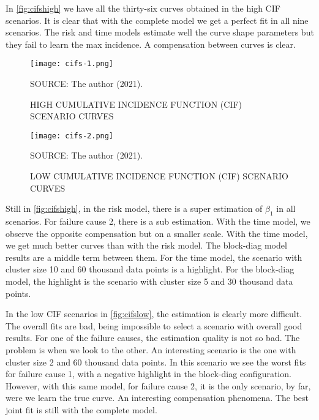 In \autoref{fig:cifshigh} we have all the thirty-six curves obtained in
the high CIF scenarios. It is clear that with the complete model we get
a perfect fit in all nine scenarios. The risk and time models estimate
well the curve shape parameters but they fail to learn the max
incidence. A compensation between curves is clear.

\begin{figure}[H]
 \setlength{\abovecaptionskip}{.0001pt}
 \caption{HIGH CUMULATIVE INCIDENCE FUNCTION (CIF) SCENARIO CURVES}
 \vspace{0.2cm}\centering
 \texttt{[image: cifs-1.png]}\\
 \begin{footnotesize}
  SOURCE: The author (2021).
 \end{footnotesize}
 \label{fig:cifshigh}
\end{figure}

\begin{figure}[H]
 \setlength{\abovecaptionskip}{.0001pt}
 \caption{LOW CUMULATIVE INCIDENCE FUNCTION (CIF) SCENARIO CURVES}
 \vspace{0.2cm}\centering
 \texttt{[image: cifs-2.png]}\\
 \begin{footnotesize}
  SOURCE: The author (2021).
 \end{footnotesize}
 \label{fig:cifslow}
\end{figure}

Still in \autoref{fig:cifshigh}, in the risk model, there is a super
estimation of \(\beta_{1}\) in all scenarios. For failure cause 2, there
is a sub estimation. With the time model, we observe the opposite
compensation but on a smaller scale. With the time model, we get much
better curves than with the risk model. The block-diag model results are
a middle term between them. For the time model, the scenario with
cluster size 10 and 60 thousand data points is a highlight. For the
block-diag model, the highlight is the scenario with cluster size 5 and
30 thousand data points.

In the low CIF scenarios in \autoref{fig:cifslow}, the estimation is
clearly more difficult. The overall fits are bad, being impossible to
select a scenario with overall good results. For one of the failure
causes, the estimation quality is not so bad. The problem is when we
look to the other. An interesting scenario is the one with cluster size
2 and 60 thousand data points. In this scenario we see the worst fits
for failure cause 1, with a negative highlight in the block-diag
configuration. However, with this same model, for failure cause 2, it is
the only scenario, by far, were we learn the true curve. An interesting
compensation phenomena. The best joint fit is still with the complete
model.

